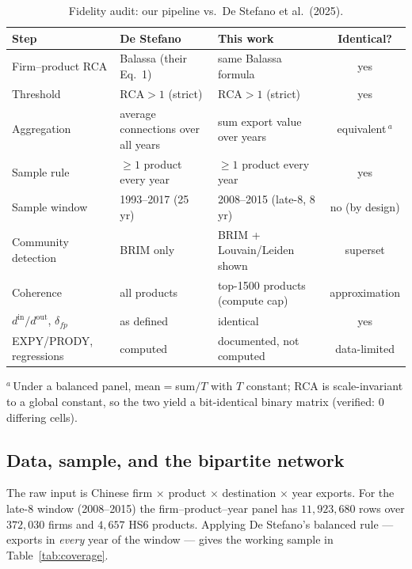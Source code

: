 \documentclass[11pt]{article}
\newcommand{\din}{d^{\mathrm{in}}}
\newcommand{\dout}{d^{\mathrm{out}}}
\begin{document}
\begin{table}[H]\centering\small
\caption{Fidelity audit: our pipeline vs.\ De Stefano et al.\ (2025).}
\label{tab:fidelity}
\begin{tabular}{@{}lp{4.2cm}p{4.2cm}c@{}}
\toprule
Step & De Stefano & This work & Identical? \\
\midrule
Firm--product RCA      & Balassa (their Eq.~1)                 & same Balassa formula                 & yes \\
Threshold              & $\mathrm{RCA}>1$ (strict)             & $\mathrm{RCA}>1$ (strict)            & yes \\
Aggregation            & average connections over all years    & sum export value over years          & equivalent\,$^{a}$ \\
Sample rule            & $\geq 1$ product every year           & $\geq 1$ product every year          & yes \\
Sample window          & 1993--2017 (25 yr)                    & 2008--2015 (late-8, 8 yr)            & no (by design) \\
Community detection    & BRIM only                             & BRIM + Louvain/Leiden shown          & superset \\
Coherence              & all products                          & top-1500 products (compute cap)      & approximation \\
$\din/\dout$, $\delta_{fp}$ & as defined                       & identical                            & yes \\
EXPY/PRODY, regressions& computed                              & documented, not computed             & data-limited \\
\bottomrule
\end{tabular}

\smallskip
\footnotesize $^{a}$\,Under a balanced panel, mean$=$sum$/T$ with $T$ constant; RCA is scale-invariant to a
global constant, so the two yield a bit-identical binary matrix (verified: $0$ differing cells).
\end{table}

\subsection{Data, sample, and the bipartite network}

The raw input is Chinese firm $\times$ product $\times$ destination $\times$ year exports. For the late-8
window (2008--2015) the firm--product--year panel has $11{,}923{,}680$ rows over $372{,}030$ firms and
$4{,}657$ HS6 products. Applying De Stefano's balanced rule --- exports in \emph{every} year of the window ---
gives the working sample in Table~\ref{tab:coverage}.
\end{document}
